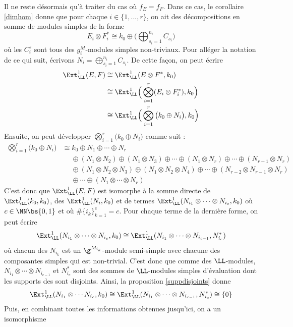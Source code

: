\begin{Thm}
\begin{pre}
Il ne reste désormais qu'à traiter du cas où $f_E = f_F$. Dans ce cas, le corollaire \ref{dimhom} donne que pour chaque $i \in \{1,...,r\}$, on ait des décompositions en somme de modules simples de la forme
$$ E_i \otimes F_i^* \cong k_0 \oplus \Big(\bigoplus_{s_i=1}^{n_i} C_{s_i}\Big) $$
où les $C_i^s$ sont tous des $g^M_i$-modules simples non-triviaux. Pour alléger la notation de ce qui suit, écrivons $N_i = \bigoplus_{s_i=1}^{n_i} C_{s_i}$. De cette façon, on peut écrire
\begin{align*}
\Ext_\LL^1(E,F) &\cong \Ext_\LL^1(E \otimes F^*,k_0)\\
&\cong \Ext_\LL^1\Big(\bigotimes_{i=1}^r (E_i \otimes F_i^*),k_0\Big)\\
&\cong \Ext_\LL^1\Big(\bigotimes_{i=1}^r \big(k_0 \oplus N_i\big),k_0\Big)
\end{align*}
Ensuite, on peut développer $\bigotimes_{i=1}^r \big(k_0 \oplus N_i\big)$ comme suit :
\begin{align*}
\textstyle{\bigotimes_{i=1}^r} \big(k_0 \oplus N_i\big) &\cong k_0 \oplus N_1 \oplus \cdots \oplus N_r\\
&\quad\; \oplus (N_1 \otimes N_2) \oplus (N_1 \otimes N_3) \oplus \cdots \oplus (N_1 \otimes N_r) \oplus \cdots \oplus (N_{r-1} \otimes N_r)\\
&\quad\; \oplus (N_1 \otimes N_2 \otimes N_3) \oplus (N_1 \otimes N_2 \otimes N_4) \oplus \cdots \oplus (N_{r-2} \otimes N_{r-1} \otimes N_r)\\
&\quad\; \oplus \cdots \oplus (N_1 \otimes \cdots \otimes N_r)
\end{align*}
C'est donc que $\Ext_\LL^1(E,F)$ est isomorphe à la somme directe de $\Ext_\LL^1(k_0,k_0)$, des $\Ext_\LL^1(N_i,k_0)$ et de termes $\Ext_\LL^1(N_{i_1} \otimes \cdots \otimes N_{i_c},k_0)$ où $c \in \NN \bs \{0,1\}$ et où $\#\{i_k\}_{k=1}^c = c$. Pour chaque terme de la dernière forme, on peut écrire
$$ \Ext_\LL^1(N_{i_1} \otimes \cdots \otimes N_{i_c},k_0) \cong \Ext_\LL^1(N_{i_1} \otimes \cdots \otimes N_{i_{c-1}},N_{i_c}^*) $$
où chacun des $N_{i_k}$ est un $\g^{M_{i_k}}$-module semi-simple avec chacune des composantes simples qui est non-trivial. C'est donc que comme des $\LL$-modules, $N_{i_1} \otimes \cdots \otimes N_{i_{c-1}}$ et $N_{i_c}^*$ sont des sommes de $\LL$-modules simples d'évaluation dont les supports des sont disjoints. Ainsi, la proposition \ref{suppdisjoints} donne 
$$ \Ext_\LL^1(N_{i_1} \otimes \cdots N_{i_c},k_0) \cong \Ext_\LL^1(N_{i_1} \otimes \cdots \otimes N_{i_{c-1}},N_{i_c}^*) \cong \{0\} $$
Puis, en combinant toutes les informations obtenues jusqu'ici, on a un isomorphisme

\end{pre}
\end{Thm}
